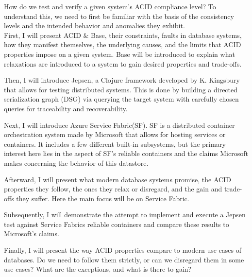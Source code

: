 \documentclass[a4paper,10pt,titlepage]{report}
\begin{document}
\vspace{5mm}
How do we test and verify a given system's ACID compliance level? To understand this, we need to first be familiar with the basis of the consistency levels and the intended behavior and anomalies they exhibit.\\


First, I will present ACID \& Base, their constraints, faults in database systems, how they manifest themselves, the underlying causes, and the limits that ACID properties impose on a given system. Base will be introduced to explain what relaxations are introduced to a system to gain desired properties and trade-offs.\\
\vspace{5mm}

Then, I will introduce Jepsen, a Clojure framework\cite{jepsonio} developed by K. Kingsbury that allows for testing distributed systems. This is done by building a directed serialization graph (DSG) via querying the target system with carefully chosen queries for traceability and recoverability.  \\
\vspace{5mm}

Next, I will introduce Azure Service Fabric(SF). SF is a distributed container orchestration system made by Microsoft that allows for hosting services or containers. It includes a few different built-in subsystems, but the primary interest here lies in the aspect of SF's reliable containers and the claims Microsoft makes concerning the behavior of this datastore.\\
\vspace{5mm}

Afterward, I will present what modern database systems promise, the ACID properties they follow, the ones they relax or disregard, and the gain and trade-offs they suffer. Here the main focus will be on Service Fabric.\\
\vspace{5mm}

Subsequently,  I will demonstrate  the attempt to implement and execute a Jepsen test against Service Fabrics reliable containers and compare these results to Microsoft's claims.\\
\vspace{5mm}

Finally, I will present the way ACID properties compare to modern use cases of databases. Do we need to follow them strictly, or can we disregard them in some use cases? What are the exceptions, and what is there to gain?\\
\end{document}

